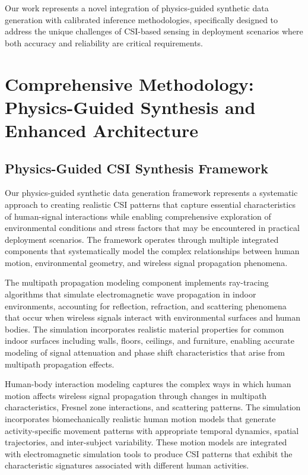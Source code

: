 \documentclass[journal]{IEEEtran}
\begin{document}
Our work represents a novel integration of physics-guided synthetic data generation with calibrated inference methodologies, specifically designed to address the unique challenges of CSI-based sensing in deployment scenarios where both accuracy and reliability are critical requirements.

\section{Comprehensive Methodology: Physics-Guided Synthesis and Enhanced Architecture}

\subsection{Physics-Guided CSI Synthesis Framework}

Our physics-guided synthetic data generation framework represents a systematic approach to creating realistic CSI patterns that capture essential characteristics of human-signal interactions while enabling comprehensive exploration of environmental conditions and stress factors that may be encountered in practical deployment scenarios. The framework operates through multiple integrated components that systematically model the complex relationships between human motion, environmental geometry, and wireless signal propagation phenomena.

The multipath propagation modeling component implements ray-tracing algorithms that simulate electromagnetic wave propagation in indoor environments, accounting for reflection, refraction, and scattering phenomena that occur when wireless signals interact with environmental surfaces and human bodies. The simulation incorporates realistic material properties for common indoor surfaces including walls, floors, ceilings, and furniture, enabling accurate modeling of signal attenuation and phase shift characteristics that arise from multipath propagation effects.

Human-body interaction modeling captures the complex ways in which human motion affects wireless signal propagation through changes in multipath characteristics, Fresnel zone interactions, and scattering patterns. The simulation incorporates biomechanically realistic human motion models that generate activity-specific movement patterns with appropriate temporal dynamics, spatial trajectories, and inter-subject variability. These motion models are integrated with electromagnetic simulation tools to produce CSI patterns that exhibit the characteristic signatures associated with different human activities.
\end{document}
